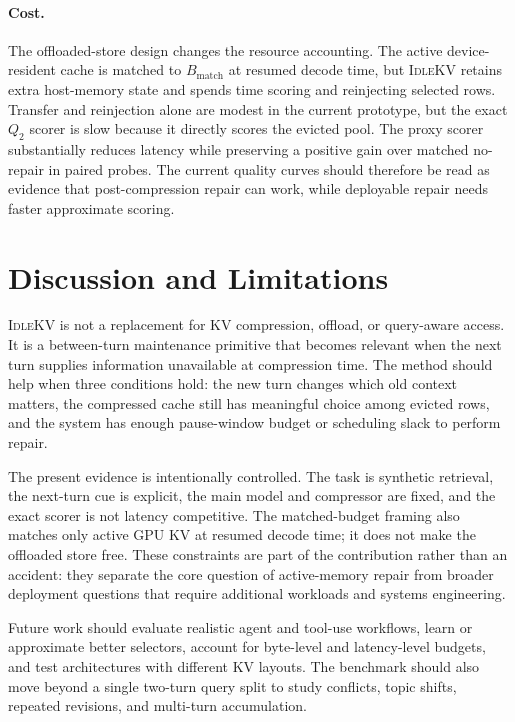 \documentclass{article}
\newcommand{\idlekv}{\textsc{IdleKV}}
\newcommand{\bmatch}{\ensuremath{B_{\mathrm{match}}}}
\begin{document}
\paragraph{Cost.}
The offloaded-store design changes the resource accounting.
The active device-resident cache is matched to $\bmatch$ at resumed
decode time, but \idlekv{} retains extra host-memory state and spends
time scoring and reinjecting selected rows.
Transfer and reinjection alone are modest in the current prototype, but
the exact $Q_2$ scorer is slow because it directly scores the evicted
pool.
The proxy scorer substantially reduces latency while preserving a
positive gain over matched no-repair in paired probes.
The current quality curves should therefore be read as evidence that
post-compression repair can work, while deployable repair needs faster
approximate scoring.

\section{Discussion and Limitations}
\label{sec:discussion}

\idlekv{} is not a replacement for KV compression, offload, or
query-aware access.
It is a between-turn maintenance primitive that becomes relevant when
the next turn supplies information unavailable at compression time.
The method should help when three conditions hold: the new turn changes
which old context matters, the compressed cache still has meaningful
choice among evicted rows, and the system has enough pause-window budget
or scheduling slack to perform repair.

The present evidence is intentionally controlled.
The task is synthetic retrieval, the next-turn cue is explicit, the main
model and compressor are fixed, and the exact scorer is not latency
competitive.
The matched-budget framing also matches only active GPU KV at resumed
decode time; it does not make the offloaded store free.
These constraints are part of the contribution rather than an accident:
they separate the core question of active-memory repair from broader
deployment questions that require additional workloads and systems
engineering.

Future work should evaluate realistic agent and tool-use workflows,
learn or approximate better selectors, account for byte-level and
latency-level budgets, and test architectures with different KV layouts.
The benchmark should also move beyond a single two-turn query split to
study conflicts, topic shifts, repeated revisions, and multi-turn
accumulation.
\end{document}
